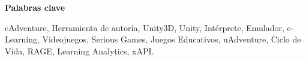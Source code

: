 \vspace{1cm}


\begin{center}

{\bf \Large Palabras clave}

   \end{center}

   \vspace{0.5cm}
   
eAdventure, Herramienta de autoría, Unity3D, Unity, Intérprete, Emulador, e-Learning, Videojuegos, Serious Games, Juegos Educativos, uAdventure, Ciclo de Vida, RAGE, Learning Analytics, xAPI.
   


